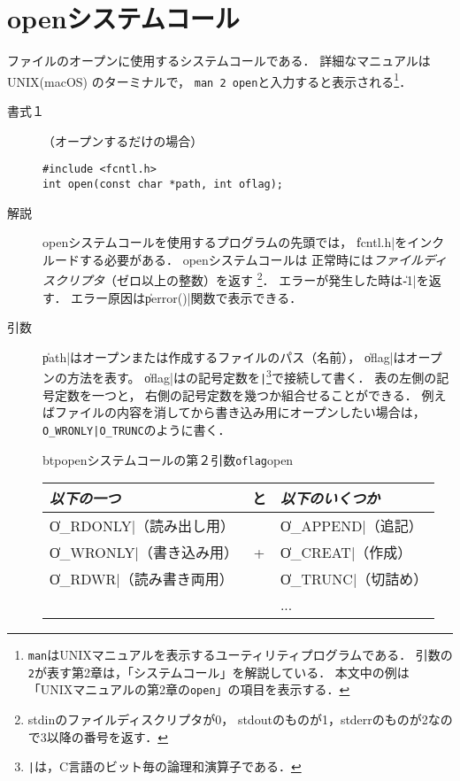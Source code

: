 \section{openシステムコール}
ファイルのオープンに使用するシステムコールである．
詳細なマニュアルは UNIX(macOS) のターミナルで，
\texttt{man 2 open}と入力すると表示される\footnote{
\texttt{man}はUNIXマニュアルを表示するユーティリティプログラムである．
引数の\texttt{2}が表す第2章は，「システムコール」を解説している．
本文中の例は「UNIXマニュアルの第2章の\texttt{open}」の項目を表示する．}．

\begin{description}
\item[書式１]（オープンするだけの場合）

\begin{lstlisting}[numbers=none]
#include <fcntl.h>
int open(const char *path, int oflag);
\end{lstlisting}

\item[解説]
openシステムコールを使用するプログラムの先頭では，
\|fcntl.h|をインクルードする必要がある．
openシステムコールは
正常時には\emph{ファイルディスクリプタ}（ゼロ以上の整数）を返す
\footnote{stdinのファイルディスクリプタが0，
stdoutのものが1，stderrのものが2なので3以降の番号を返す．}．
エラーが発生した時は\|-1|を返す．
エラー原因は\|perror()|関数で表示できる．

\item[引数]
\|path|はオープンまたは作成するファイルのパス（名前），
\|oflag|はオープンの方法を表す。
\|oflag|はの記号定数を\texttt{|}\footnote{
\texttt{|}は，C言語のビット毎の論理和演算子である．}で接続して書く．
表の左側の記号定数を一つと，
右側の記号定数を幾つか組合せることができる．
例えばファイルの内容を消してから書き込み用にオープンしたい場合は，
\verb;O_WRONLY|O_TRUNC;のように書く．

\begin{mytable}{btp}{openシステムコールの第２引数\texttt{oflag}}{open}
\begin{tabular}{l | c | l}
\hline\hline
\emph{以下の一つ} & と & \emph{以下のいくつか} \\\hline
\|O_RDONLY|（読み出し用） &    & \|O_APPEND|（追記）  \\
\|O_WRONLY|（書き込み用） & +  & \|O_CREAT|（作成）   \\
\|O_RDWR|（読み書き両用） &    & \|O_TRUNC|（切詰め） \\
                      &    & ...      \\
\end{tabular}
\end{mytable}


\end{description}
